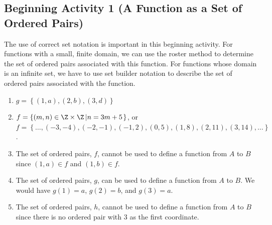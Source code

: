 \documentclass[11pt]{article}
\begin{document}
\subsection*{Beginning Activity 1 (A Function as a Set of Ordered Pairs)}
The use of correct set notation is important in this beginning activity.  For functions with a small, finite domain, we can use the roster method to determine the set of ordered pairs associated with this function.  For functions whose domain is an infinite set, we have to use set builder notation to describe the set of ordered pairs associated with the function.
\begin{enumerate}
\item $g = \left\{ (1, a), (2, b), (3, d) \right\}$

\item $f = \left\{ (m, n) \in \Z \times \Z \left| n = 3m + 5 \right. \right\}$, or \\
$f = \left\{  \ldots , (-3, -4), (-2, -1), (-1, 2), (0, 5), (1, 8), (2, 11), (3, 14), \ldots \right\}$.


\item The set of ordered pairs, $f$, cannot be used to define a function from  $A$  to  $B$  since  $\left( {1, a} \right) \in f$ and  $\left( {1, b} \right) \in f$.

\item The set of ordered pairs, $g$, can be used to define a function from  $A$  to  $B$.  We would have  $g\left( 1 \right) = a$, $g\left( 2 \right) = b$, and $g\left( 3 \right) = a$.

\item The set of ordered pairs, $h$, cannot be used to define a function from  $A$  to  $B$  since there is no ordered pair with  3  as the first coordinate.
\end{enumerate}
\hbreak

\noindent
\end{document}
